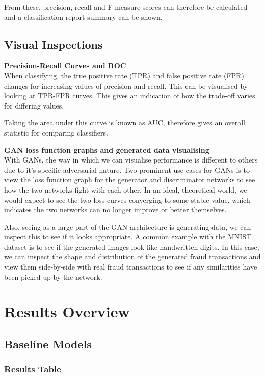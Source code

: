 \documentclass[12pt,a4paper,twoside]{report}
\begin{document}
From these, precision, recall and F measure scores can therefore be calculated and a classification report summary can be shown. 

\subsection{Visual Inspections}

\textbf{Precision-Recall Curves and ROC}\\
When classifying, the true positive rate (TPR) and false positive rate (FPR) changes for increasing values of precision and recall. This can be visualised by looking at TPR-FPR curves. This gives an indication of how the trade-off varies for differing values.

Taking the area under this curve is known as AUC, therefore gives an overall statistic for comparing classifiers. 

\textbf{GAN loss function graphs and generated data visualising}\\
With GANs, the way in which we can visualise performance is different to others due to it's specific adversarial nature. Two prominent use cases for GANs is to view the loss function graph for the generator and discriminator networks to see how the two networks fight with each other. In an ideal, theoretical world, we would expect to see the two loss curves converging to some stable value, which indicates the two networks can no longer improve or better themselves. 

Also, seeing as a large part of the GAN architecture is generating data, we can inspect this to see if it looks appropriate. A common example with the MNIST dataset is to see if the generated images look like handwritten digits. In this case, we can inspect the shape and distribution of the generated fraud transactions and view them side-by-side with real fraud transactions to see if any similarities have been picked up by the network.

\section{Results Overview}
\subsection{Baseline Models}
\subsubsection{Results Table}
\end{document}
